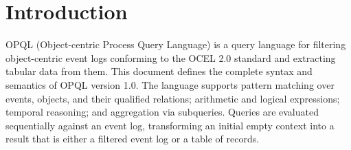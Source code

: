\section{Introduction}

OPQL (Object-centric Process Query Language) is a query language for filtering object-centric event logs conforming to the OCEL 2.0 standard and extracting tabular data from them. This document defines the complete syntax and semantics of OPQL version 1.0. The language supports pattern matching over events, objects, and their qualified relations; arithmetic and logical expressions; temporal reasoning; and aggregation via subqueries. Queries are evaluated sequentially against an event log, transforming an initial empty context into a result that is either a filtered event log or a table of records.

